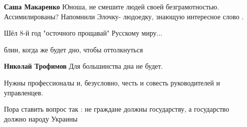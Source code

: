 \begin{itemize}
\begin{itemize}
 
\textbf{Саша Макаренко} Юноша, не смешите людей своей безграмотностью. Ассимилированы? Напомнили Элочку- людоедку, знающую интересное слово .
\end{itemize}

 
Шёл 8-й год "осточного прощавай" Русскому миру...

 
блин, когда же будет дно, чтобы оттолкнуться

\begin{itemize}
 
\textbf{Николай Трофимов} Для большинства дна не будет.
\end{itemize}

 
Нужны профессионалы и, безусловно, честь и совесть руководителей и управленцев.

Пора ставить вопрос так : не граждане должны государству, а государство должно
народу Украины

\begin{itemize}
 

\end{itemize}
\end{itemize}
